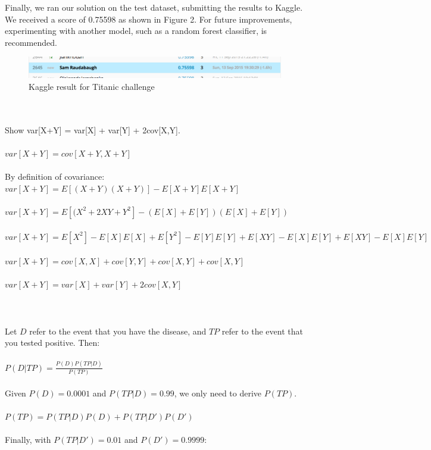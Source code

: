 \documentclass[12pt]{report}
\begin{document}
Finally, we ran our solution on the test dataset, submitting the results to Kaggle. We received a score of 0.75598 as shown in Figure 2. For future improvements, experimenting with another model,
such as a random forest classifier, is recommended.
\begin{figure}
\centering
  \includegraphics[width=150mm]{figures/kaggle-titanic.png}
\caption{Kaggle result for Titanic challenge}
\end{figure}
\newpage
{}
\\\\
Show var[X+Y] = var[X] + var[Y] + 2cov[X,Y].
\\\\
$var[X+Y] = cov[X+Y, X+Y]$
\\\\
By definition of covariance:
\\
$var[X+Y] = E[(X+Y)(X+Y)] - E[X+Y]E[X+Y]$
\\\\
$var[X+Y] = E[(X^2+2XY+Y^2]-(E[X]+E[Y])(E[X]+E[Y])$
\\\\
$var[X+Y] = E[X^2]-E[X]E[X] + E[Y^2]-E[Y]E[Y] + E[XY]-E[X]E[Y] + E[XY]-E[X]E[Y]$
\\\\
$var[X+Y] = cov[X,X] + cov[Y,Y] + cov[X,Y] + cov[X,Y]$
\\\\
$var[X+Y] = var[X] + var[Y] + 2cov[X,Y]$
\\\\
\\\\
Let $D$ refer to the event that you have the disease, and $TP$ refer to the event that you tested positive. Then:
\\\\
$P(D|TP) = \frac{P(D)P(TP|D)}{P(TP)}$
\\\\
Given $P(D) = 0.0001$ and $P(TP|D) = 0.99$, we only need to derive $P(TP)$.
\\\\
$P(TP) = P(TP|D)P(D)+P(TP|D')P(D')$
\\\\
Finally, with $P(TP|D') = 0.01$ and $P(D') = 0.9999$:
\end{document}
